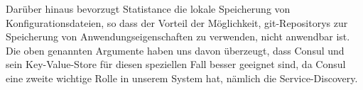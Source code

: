 Darüber hinaus bevorzugt Statistance die lokale Speicherung von Konfigurationsdateien, so dass der Vorteil der Möglichkeit, git-Repositorys zur Speicherung von Anwendungseigenschaften zu verwenden, nicht anwendbar ist. Die oben genannten Argumente haben uns davon überzeugt, dass Consul und sein Key-Value-Store für diesen speziellen Fall besser geeignet sind, da Consul eine zweite wichtige Rolle in unserem System hat, nämlich die Service-Discovery.